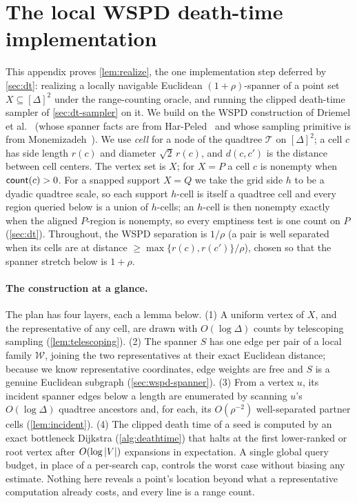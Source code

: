 \section{The local WSPD death-time implementation}\label{sec:wspd}

This appendix proves \cref{lem:realize}, the one implementation step deferred by \cref{sec:dt}: realizing a
locally navigable Euclidean $(1+\rho)$-spanner of a point set $X\subseteq[\Delta]^2$ under the
range-counting oracle, and running the clipped death-time sampler of \cref{sec:dt-sampler} on it. We build on the
WSPD construction of Driemel et al.~\cite{DMOSW25} (whose spanner
facts are from Har-Peled~\cite{HarPeled11} and whose sampling primitive is from
Monemizadeh~\cite{Monemizadeh23}). We use \emph{cell} for a node of the quadtree $\mathcal T$ on
$[\Delta]^2$; a cell $c$ has side length $r(c)$ and diameter $\sqrt2\,r(c)$, and $d(c,c')$ is the distance
between cell centers. The vertex set is $X$; for $X=P$ a cell $c$ is nonempty when $\mathsf{count}(c)>0$. For a
snapped support $X=Q$ we take the grid side $h$ to be a dyadic quadtree scale, so each support $h$-cell is
itself a quadtree cell and every region queried below is a union of $h$-cells; an $h$-cell is then nonempty
exactly when the aligned $P$-region is nonempty, so every emptiness test is one count on $P$
(\cref{sec:dt}). Throughout, the WSPD separation is $1/\rho$ (a
pair is well separated when its cells are at distance $\ge\max\{r(c),r(c')\}/\rho$), chosen so that the
spanner stretch below is $1+\rho$.

\paragraph{The construction at a glance.}
The plan has four layers, each a lemma below. (1) A uniform vertex of $X$, and the representative of any
cell, are drawn with $O(\log\Delta)$ counts by telescoping sampling (\cref{lem:telescoping}). (2) The
spanner $S$ has one edge per pair of a local family $\widehat{\mathcal W}$, joining the two representatives at their exact Euclidean
distance; because we know representative coordinates, edge weights are free and $S$ is a genuine Euclidean
subgraph (\cref{sec:wspd-spanner}). (3) From a vertex $u$, its incident spanner edges below a length are
enumerated by scanning $u$'s $O(\log\Delta)$ quadtree ancestors and, for each, its $O(\rho^{-2})$
well-separated partner cells (\cref{lem:incident}). (4) The clipped death time of a seed is computed by an
exact bottleneck Dijkstra (\cref{alg:deathtime}) that halts at the first lower-ranked or root vertex after
$O(\log\left|V\right|)$ expansions in expectation. A single global query budget, in place of a per-search cap,
controls the worst case without biasing any estimate. Nothing here reveals a point's location beyond what
a representative computation already costs, and every line is a range count.

